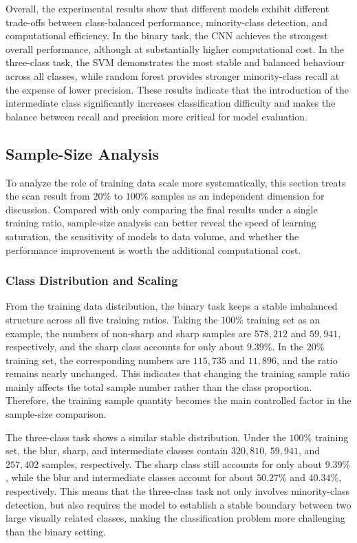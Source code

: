 \par Overall, the experimental results show that different models exhibit
different trade-offs between class-balanced performance, minority-class
detection, and computational efficiency. In the binary task, the CNN achieves
the strongest overall performance, although at substantially higher
computational cost. In the three-class task, the SVM demonstrates the most
stable and balanced behaviour across all classes, while random forest provides
stronger minority-class recall at the expense of lower precision. These results
indicate that the introduction of the intermediate class significantly
increases classification difficulty and makes the balance between recall and
precision more critical for model evaluation.
\subsection{Sample-Size Analysis}

\par To analyze the role of training data scale more systematically, this
section treats the scan result from $20\%$ to $100\%$ samples as an independent
dimension for discussion. Compared with only comparing the final results under a
single training ratio, sample-size analysis can better reveal the speed of
learning saturation, the sensitivity of models to data volume, and whether the
performance improvement is worth the additional computational cost.

\subsubsection{Class Distribution and Scaling}

\par From the training data distribution, the binary task keeps a stable
imbalanced structure across all five training ratios. Taking the $100\%$
training set as an example, the numbers of non-sharp and sharp samples are
$578,212$ and $59,941$, respectively, and the sharp class accounts for only
about $9.39\%$. In the $20\%$ training set, the corresponding numbers are
$115,735$ and $11,896$, and the ratio remains nearly unchanged. This indicates
that changing the training sample ratio mainly affects the total sample number
rather than the class proportion. Therefore, the training sample quantity
becomes the main controlled factor in the sample-size comparison.

\par The three-class task shows a similar stable distribution. Under the
$100\%$ training set, the blur, sharp, and intermediate classes contain
$320,810$, $59,941$, and $257,402$ samples, respectively. The sharp class still
accounts for only about $9.39\%$, while the blur and intermediate classes
account for about $50.27\%$ and $40.34\%$, respectively. This means that the
three-class task not only involves minority-class detection, but also requires
the model to establish a stable boundary between two large visually related
classes, making the classification problem more challenging than the binary
setting.

